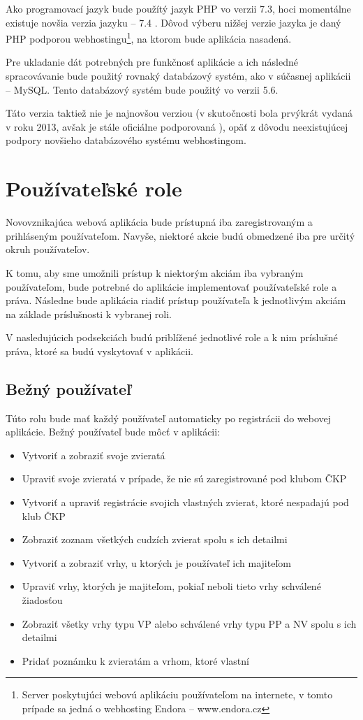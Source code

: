 Ako programovací jazyk bude použítý jazyk PHP vo verzii 7.3, hoci momentálne existuje novšia verzia jazyku -- 7.4 \cite{verzie-php}.
Dôvod výberu nižšej verzie jazyka je daný PHP podporou webhostingu\footnote{Server poskytujúci webovú aplikáciu používateľom na internete, v tomto prípade sa jedná o webhosting Endora -- www.endora.cz}, na ktorom bude aplikácia nasadená.

Pre ukladanie dát potrebných pre funkčnosť aplikácie a ich následné spracovávanie bude použitý rovnaký databázový systém, ako v súčasnej aplikácii -- MySQL. Tento databázový systém bude použitý vo verzii 5.6.

Táto verzia taktiež nie je najnovšou verziou (v skutočnosti bola prvýkrát vydaná v roku 2013, avšak je stále oficiálne podporovaná \cite{verzie-mysql}), opäť z dôvodu neexistujúcej podpory novšieho databázového systému webhostingom.

\pagebreak

\section{Používateľské role}\label{pouzivatelske-role}
Novovznikajúca webová aplikácia bude prístupná iba zaregistrovaným a prihláseným používateľom. Navyše, niektoré akcie budú obmedzené iba pre určitý okruh používateľov.

K tomu, aby sme umožnili prístup k niektorým akciám iba vybraným používateľom, bude potrebné do aplikácie implementovať používateľské role a práva. Následne bude aplikácia riadiť prístup používateľa k jednotlivým akciám na základe príslušnosti k vybranej roli.

V nasledujúcich podsekciách budú priblížené jednotlivé role a k nim príslušné práva, ktoré sa budú vyskytovať v aplikácii.

\subsection{Bežný používateľ}\label{bezny-pouzivatel}
Túto rolu bude mať každý používateľ automaticky po registrácii do webovej aplikácie. Bežný používateľ bude môcť v aplikácii: 

\begin{itemize}
	\item Vytvoriť a zobraziť svoje zvieratá
	\item Upraviť svoje zvieratá v prípade, že nie sú zaregistrované pod klubom ČKP
	\item Vytvoriť a upraviť registrácie svojich vlastných zvierat, ktoré nespadajú pod klub ČKP
	\item Zobraziť zoznam všetkých cudzích zvierat spolu s ich detailmi
	\item Vytvoriť a zobraziť vrhy, u ktorých je používateľ ich majiteľom
	\item Upraviť vrhy, ktorých je majiteľom, pokiaľ neboli tieto vrhy schválené žiadosťou
	\item Zobraziť všetky vrhy typu VP alebo schválené vrhy typu PP a NV spolu s ich detailmi
	\item Pridať poznámku k zvieratám a vrhom, ktoré vlastní
\end{itemize}

